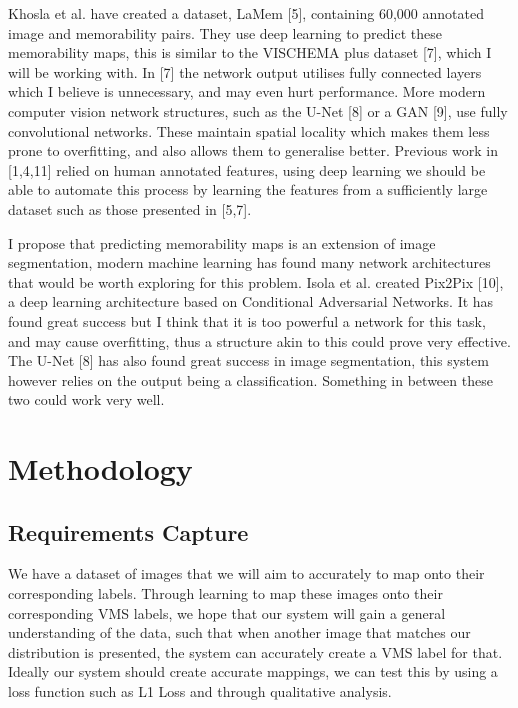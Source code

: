 \documentclass[11pt]{article}
\begin{document}
Khosla et al. have created a dataset, LaMem [5], containing 60,000 annotated image and memorability pairs. They use deep learning to predict these memorability maps, this is similar to the VISCHEMA plus dataset [7], which I will be working with. In [7] the network output utilises fully connected layers which I believe is unnecessary, and may even hurt performance. More modern computer vision network structures, such as the U-Net [8] or a GAN [9], use fully convolutional networks. These maintain spatial locality which makes them less prone to overfitting, and also allows them to generalise better. Previous work in [1,4,11] relied on human annotated features, using deep learning we should be able to automate this process by learning the features from a sufficiently large dataset such as those presented in [5,7].

I propose that predicting memorability maps is an extension of image segmentation, modern machine learning has found many network architectures that would be worth exploring for this problem. Isola et al. created Pix2Pix [10], a deep learning architecture based on Conditional Adversarial Networks. It has found great success but I think that it is too powerful a network for this task, and may cause overfitting, thus a structure akin to this could prove very effective. The U-Net [8] has also found great success in image segmentation, this system however relies on the output being a classification. Something in between these two could work very well.

\newpage{}

\section{Methodology}




\subsection{Requirements Capture}

We have a dataset of images that we will aim to accurately to map onto their corresponding labels. Through learning to map these images onto their corresponding VMS labels, we hope that our system will gain a general understanding of the data, such that when another image that matches our distribution is presented, the system can accurately create a VMS label for that. Ideally our system should create accurate mappings, we can test this by using a loss function such as L1 Loss and through qualitative analysis. 
\end{document}
